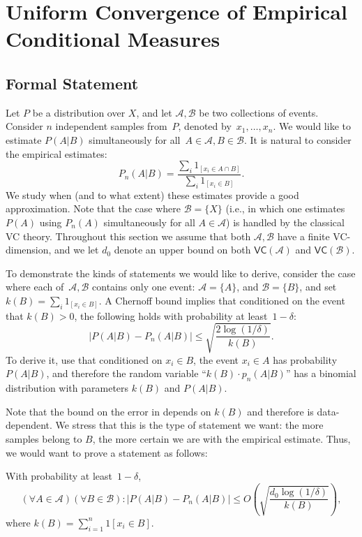 \documentclass{article}
\def\B{{\mathcal B}}
\newcommand{\cA}{\mathcal{A}}
\newcommand{\cB}{\mathcal{B}}
\begin{document}
\section{Uniform Convergence of Empirical Conditional Measures}
\label{sec:ucecm}

\subsection{Formal Statement}

Let $P$ be a distribution over $X$, and let $\cA,\cB$ be two collections of events.
Consider $n$ independent samples from~$P$, denoted by~$x_1,\ldots,x_n$.
We would like to estimate $P(A \vert B)$ simultaneously for all~$A\in\cA, B\in \cB$.
It is natural to consider the empirical estimates:
\[P_n(A\vert B)=\frac{\sum_i 1_{[x_i\in A \cap B]}}{\sum_i 1_{[x_i\in B]}}.\]
We study when (and to what extent) these estimates provide a good approximation.
Note that the case where $\cB=\{X\}$ (i.e., in which one estimates $P(A)$
using $P_n(A)$ simultaneously for all $A\in\cA$) is handled by the classical VC theory.
Throughout this section we assume that both $\cA,\cB$ have a finite VC-dimension, 
and we let $d_0$ denote an upper bound on both $\mathsf{VC}(\cA)$ and $\mathsf{VC}(\cB)$.

To demonstrate the kinds of statements we would like to derive,
consider the case where each of~$\cA,\cB$ contains only one event:
$\cA=\{A\}$, and $\cB=\{B\}$,
and set $k(B)=\sum_i 1_{[x_i\in B]}$.
A Chernoff bound implies that conditioned on the event that $k(B)>0$, 
the following holds with probability at least~$1-\delta$:
\begin{equation}\label{eq:chernoff}
\left\lvert P(A\vert B) - P_n(A \vert B) \right\rvert \leq \sqrt{\frac{2\log(1/\delta)}{k(B)}}.
\end{equation}
To derive it, use that conditioned on $x_i\in B$, the event $x_i\in A$ has probability $P(A\vert B)$, 
and therefore the random variable ``$k(B)\cdot p_n(A \vert B)$'' has a binomial distribution with parameters $k(B)$ and $P(A\vert B)$.

Note that the bound on the error in  depends on $k(B)$ and therefore is data-dependent.
We stress that this is the type of statement we want:
the more samples belong to $B$, the more certain we are with the empirical estimate.
Thus, we would want to prove a statement as follows:

With probability at least~$1-\delta$,
\[\left(\forall A\in\cA\right)\left(\forall B\in\B\right):\left\lvert P(A \vert B) - P_n(A \vert B) \right\rvert \leq O\left(\sqrt{\frac{d_0 \log(1/\delta)}{k(B)}}\right),\]
where $k(B) = \sum_{i=1}^n 1[x_i\in B]$.
\end{document}
